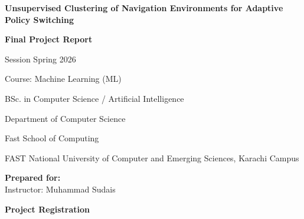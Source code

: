 \documentclass[12pt,a4paper]{article}
\begin{document}
\begin{center}
{\Large \textbf{Unsupervised Clustering of Navigation Environments for Adaptive Policy Switching}}

\vspace{0.5cm}

{\Large \textbf{Final Project Report}}

\vspace{0.5cm}

{\large Session Spring 2026}

\vspace{0.5cm}

{\large Course: Machine Learning (ML)}

\vspace{1cm}

{\large BSc. in Computer Science / Artificial Intelligence}

\vspace{1cm}

\begin{figure}[htb]
\centering
\end{figure}

\vspace{0.5cm}

{\large Department of Computer Science}

{\large Fast School of Computing}

{\large FAST National University of Computer and Emerging Sciences, Karachi Campus}

\vspace{1cm}

\textbf{Prepared for:} \\
{\large Instructor: Muhammad Sudais}

\vspace{2cm}

\newpage
{\LARGE \textbf{Project Registration}}
\end{center}

\vspace{1cm}
\end{document}
